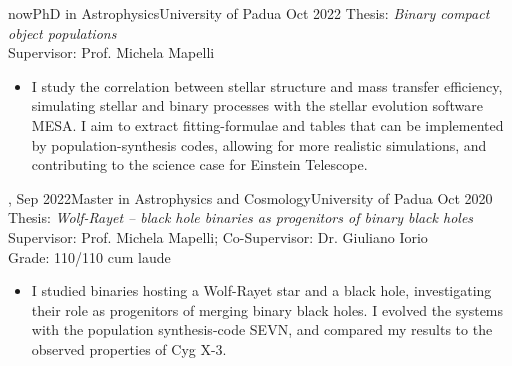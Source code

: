 %
%
%
\begin{experiences}
  \experiencetags
    {now}{PhD in Astrophysics}{University of Padua}
    {Oct 2022}
    {Thesis: \textit{Binary compact object populations} \\
    Supervisor: Prof. Michela Mapelli  }{
    \begin{itemize}
        \item  I study the correlation between stellar structure and mass transfer efficiency, simulating stellar and binary processes with the stellar evolution software MESA. I aim to extract fitting-formulae and tables that can be implemented by population-synthesis codes, allowing for more realistic simulations, and contributing to the science case for Einstein Telescope.
    \end{itemize}
   }{,}
  \emptySeparator
  \experiencetags
    {Sep 2022}{Master in Astrophysics and Cosmology}{University of Padua}
    {Oct 2020} 
    {Thesis: \textit{Wolf-Rayet -- black hole binaries as progenitors of binary black holes} \\
    Supervisor: Prof. Michela Mapelli; Co-Supervisor: Dr. Giuliano Iorio \\
    Grade: 110/110 cum laude %
    }{
    \begin{itemize}
        \item I studied binaries hosting a Wolf-Rayet star and a black hole, investigating their role as progenitors of merging binary black holes. I evolved the systems with the population synthesis-code SEVN, and compared my results to the observed properties of Cyg X-3. 

\end{itemize}}
\end{experiences}
